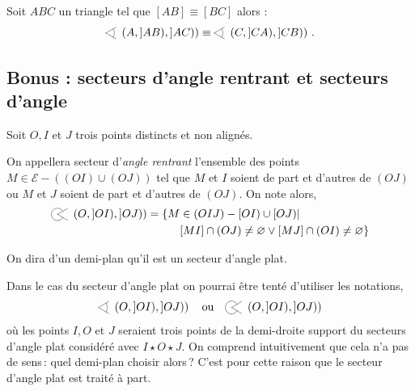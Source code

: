 \begin{prop}\label{prop-isocelecongruenceangle}
    Soit $ABC$ un triangle tel que $[AB]\equiv [BC]$ alors : $$\anglesaillant \left(A,]AB),]AC)\right)\equiv\anglesaillant \left(C,]CA),]CB)\right)\,.$$
\end{prop}

        \subsection{Bonus : secteurs d'angle rentrant et secteurs d'angle }

\begin{defi}\label{defi-anglerentrant}
    Soit $O,I$ et $J$ trois points distincts et non alignés.
    
    On appellera secteur d'\emph{angle rentrant} l'ensemble des points $M\in \mathcal{E}-((OI)\cup(OJ))$ tel que $M$ et $I$ soient de part et d'autres de $(OJ)$ ou $M$ et $J$ soient de part et d'autres de $(OJ)$. On note alors,
    \begin{align*}
        \anglerentrant \left({O},{]OI)},{]OJ)}\right) =  \{M & \in (OIJ)-[OI)\cup[OJ)|  \\
        & [MI] \cap (OJ)\neq \varnothing \lor [MJ] \cap (OI)\neq \varnothing\}
    \end{align*}
\end{defi}

\begin{defi}
    On dira d'un demi-plan qu'il est un secteur d'angle plat.  
\end{defi}

\begin{rema}
 Dans le cas du secteur d'angle plat on pourrai être tenté d'utiliser les notations,
 \begin{equation*}
      \anglesaillant\left({O},{]OI)},{]OJ)}\right) \quad \text{ou} \quad \anglerentrant\left({O},{]OI)},{]OJ)}\right)
 \end{equation*}
 où les points $I,O$ et $J$ seraient trois points de la demi-droite support du secteurs d'angle plat considéré avec $I\star O\star J$. On comprend intuitivement que cela n'a pas de sens\,: quel demi-plan choisir alors\,? C'est pour cette raison que le secteur d'angle plat est traité à part.
\end{rema}


